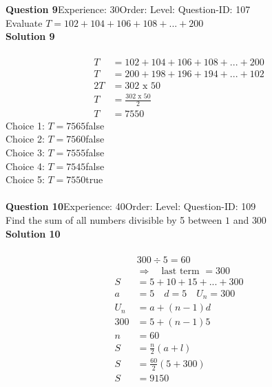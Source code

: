 \documentclass{article}
\begin{document}
\noindent\textbf{Question 9}\hspace{20pt}Experience: 30\hspace{20pt}Order: \hspace{20pt}Level: \hspace{20pt}Question-ID: 107\\[2pt]
Evaluate $T=102+104+106+108+...+200$\\[4pt]
\noindent\textbf{Solution 9}\\[2pt]
\\[-35pt]\begin{align*}
T&=102+104+106+108+...+200\\[2pt]
T&=200+198+196+194+...+102\\[2pt]
2T&=302\,\,\text{x}\,\,50\\[2pt]
T&=\displaystyle\frac{302\,\,\text{x}\,\,50}{2}\\[2pt]
T&=7550
\end{align*}
Choice 1: \hspace{20pt}$T=7565$\hspace{20pt}false\\
Choice 2: \hspace{20pt}$T=7560$\hspace{20pt}false\\
Choice 3: \hspace{20pt}$T=7555$\hspace{20pt}false\\
Choice 4: \hspace{20pt}$T=7545$\hspace{20pt}false\\
Choice 5: \hspace{20pt}$T=7550$\hspace{20pt}true\\
\\[4pt]
\noindent\textbf{Question 10}\hspace{20pt}Experience: 40\hspace{20pt}Order: \hspace{20pt}Level: \hspace{20pt}Question-ID: 109\\[2pt]
Find the sum of all numbers divisible by 5 between $1$ and $300$\\[4pt]
\noindent\textbf{Solution 10}\\[2pt]
\\[-35pt]\begin{align*}
&300 \div 5 = 60\\[2pt]
&\Rightarrow \quad \text{last term }= 300\\[2pt]
S&=5+10+15+...+300\\[12pt]
a&=5\quad d=5 \quad U_n=300\\[2pt]
U_n&=a+(n-1)d\\[2pt]
300&=5+(n-1)5\\[2pt]
n&=60\\[12pt]
S&=\displaystyle\frac{n}{2}(a+l)\\[2pt]
S&=\displaystyle\frac{60}{2}(5+300)\\[2pt]
S&=9150\\[-50pt]
\end{align*}
\end{document}
